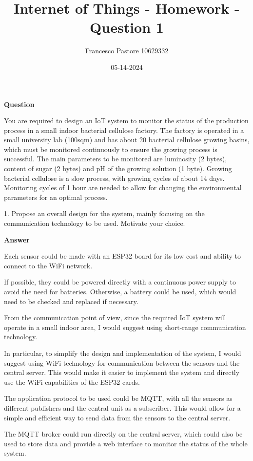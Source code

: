 \documentclass[12pt]{article}
\title{Internet of Things - Homework - Question 1}
\author{Francesco Pastore 10629332}
\date{05-14-2024}
\begin{document}
\maketitle

\textbf{Question}

You are required to design an IoT system to monitor the status of the production process in a small indoor bacterial cellulose factory.
The factory is operated in a small university lab (100sqm) and has about 20 bacterial cellulose growing basins, which must be monitored continuously to ensure the growing process is successful.
The main parameters to be monitored are luminosity (2 bytes), content of sugar (2 bytes) and pH of the growing solution (1 byte).
Growing bacterial cellulose is a slow process, with growing cycles of about 14 days.
Monitoring cycles of 1 hour are needed to allow for changing the environmental parameters for an optimal process.

1. Propose an overall design for the system, mainly focusing on the communication technology to be used. Motivate your choice.

\textbf{Answer}

Each sensor could be made with an ESP32 board for its low cost and ability to connect to the WiFi network.

If possible, they could be powered directly with a continuous power supply to avoid the need for batteries.
Otherwise, a battery could be used, which would need to be checked and replaced if necessary.

From the communication point of view, since the required IoT system will operate in a small indoor area, I would suggest using short-range communication technology.

In particular, to simplify the design and implementation of the system, I would suggest using WiFi technology for communication between the sensors and the central server.
This would make it easier to implement the system and directly use the WiFi capabilities of the ESP32 cards.

The application protocol to be used could be MQTT, with all the sensors as different publishers and the central unit as a subscriber.
This would allow for a simple and efficient way to send data from the sensors to the central server.

The MQTT broker could run directly on the central server, which could also be used to store data and provide a web interface to monitor the status of the whole system.
\end{document}
